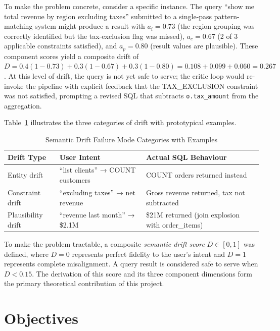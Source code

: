 \documentclass[12pt,a4paper]{report}
\begin{document}
To make the problem concrete, consider a specific instance. The query ``show me total revenue by region excluding taxes'' submitted to a single-pass pattern-matching system might produce a result with $a_i = 0.73$ (the region grouping was correctly identified but the tax-exclusion flag was missed), $a_c = 0.67$ (2 of 3 applicable constraints satisfied), and $a_p = 0.80$ (result values are plausible). These component scores yield a composite drift of $D = 0.4(1-0.73) + 0.3(1-0.67) + 0.3(1-0.80) = 0.108 + 0.099 + 0.060 = 0.267$. At this level of drift, the query is not yet safe to serve; the critic loop would re-invoke the pipeline with explicit feedback that the TAX\_EXCLUSION constraint was not satisfied, prompting a revised \ac{SQL} that subtracts \texttt{o.tax\_amount} from the aggregation.

Table~\ref{tab:drift-failure-modes} illustrates the three categories of drift with prototypical examples.

\begin{table}[H]
  \centering
  \caption{Semantic Drift Failure Mode Categories with Examples}
  \label{tab:drift-failure-modes}
  \renewcommand{\arraystretch}{1.3}
  \begin{tabularx}{\textwidth}{@{}lXX@{}}
    \toprule
    \textbf{Drift Type} & \textbf{User Intent} & \textbf{Actual SQL Behaviour} \\
    \midrule
    Entity drift       & ``list clients'' → COUNT customers & COUNT orders returned instead \\
    Constraint drift   & ``excluding taxes'' → net revenue  & Gross revenue returned, tax not subtracted \\
    Plausibility drift & ``revenue last month'' → \$2.1M   & \$21M returned (join explosion with order\_items) \\
    \bottomrule
  \end{tabularx}
\end{table}

To make the problem tractable, a composite \textit{semantic drift score} $D \in [0,1]$ was defined, where $D = 0$ represents perfect fidelity to the user's intent and $D = 1$ represents complete misalignment. A query result is considered safe to serve when $D < 0.15$. The derivation of this score and its three component dimensions form the primary theoretical contribution of this project.

\section{Objectives}
\label{sec:objectives}
\end{document}
